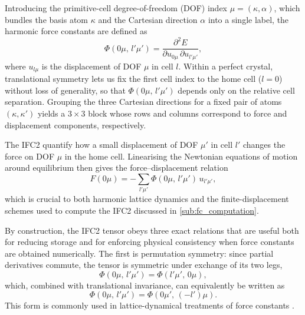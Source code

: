 Introducing the primitive-cell degree-of-freedom (DOF) index
$\mu = (\kappa, \alpha)$, which bundles the basis atom $\kappa$ and
the Cartesian direction $\alpha$ into a single label, the harmonic
force constants are defined as
\begin{equation}\label{eq:fc2_def}
  \Phi(0\mu,\, l'\mu')
  = \frac{\partial^2 E}
         {\partial u_{0\mu}\,\partial u_{l'\mu'}},
\end{equation}
where $u_{l\mu}$ is the displacement of DOF $\mu$ in cell $l$.
Within a perfect crystal, translational symmetry lets us fix the
first cell index to the home cell ($l{=}0$) without loss of
generality, so that $\Phi(0\mu,\,l'\mu')$ depends only on the
relative cell separation.  Grouping the three Cartesian directions
for a fixed pair of atoms $(\kappa,\kappa')$ yields a
$3\times 3$ block whose rows and columns correspond to force and
displacement components, respectively.

The IFC2 quantify how a small displacement of DOF $\mu'$ in cell
$l'$ changes the force on DOF $\mu$ in the home cell.  Linearising
the Newtonian equations of motion around equilibrium then gives the
force--displacement relation
\begin{equation}\label{eq:force-disp}
  F(0\mu)
  = -\sum_{l'\mu'} \Phi(0\mu,\, l'\mu')\, u_{l'\mu'},
\end{equation}
which is crucial to both harmonic lattice dynamics and the
finite-displacement schemes used to compute the IFC2 discussed in
\cref{sub:fc_computation}.

By construction, the IFC2 tensor obeys three exact relations that are
useful both for reducing storage and for enforcing physical
consistency when force constants are obtained numerically.
The first is permutation symmetry: since partial derivatives
commute, the tensor is symmetric under exchange of its two legs,
\begin{equation}\label{eq:fc2_perm}
  \Phi(0\mu,\,l'\mu') = \Phi(l'\mu',\,0\mu),
\end{equation}
which, combined with translational invariance, can equivalently be
written as
\begin{equation}
  \Phi(0\mu,\,l'\mu')
  =
  \Phi(0\mu',\,(-l')\mu).
  \label{eq:ifc-symmetry-equivalent}
\end{equation}
This form is commonly used in lattice-dynamical treatments of force
constants
\cite{born_dynamical_1996, maradudin_theory_1963, gonze_dynamical_1997}.

